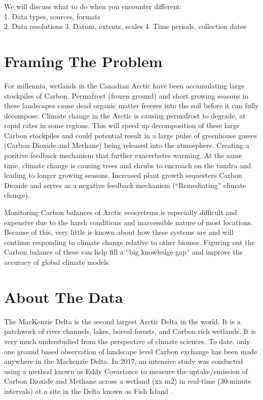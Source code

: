 \documentclass[
]{book}
\begin{document}
We will discuss what to do when you encounter different:\\
1. Data types, sources, formats\\
2. Data resolutions
3. Datum, extents, scales
4. Time periods, collection dates

\hypertarget{framing-the-problem}{%
\section{Framing The Problem}\label{framing-the-problem}}

For millennia, wetlands in the Canadian Arctic have been accumulating large stockpiles of Carbon. Permafrost (frozen ground) and short growing seasons in these landscapes cause dead organic matter freezes into the soil before it can fully decompose. Climate change in the Arctic is causing permafrost to degrade, at rapid rates in some regions. This will speed up decomposition of these large Carbon stockpiles and could potential result in a large pulse of greenhouse gasses (Carbon Dioxide and Methane) being released into the atmosphere. Creating a positive feedback mechanism that further exacerbates warming. At the same time, climate change is causing trees and shrubs to encroach on the tundra and leading to longer growing seasons. Increased plant growth sequesters Carbon Dioxide and serves as a negative feedback mechanism (``Remediating'' climate change).

Monitoring Carbon balances of Arctic ecosystems is especially difficult and expensive due to the harsh conditions and inaccessible nature of most locations. Because of this, very little is known about how these systems are and will continue responding to climate change relative to other biomes. Figuring out the Carbon balance of these can help fill a ``big knowledge gap'' and improve the accuracy of global climate models.

\hypertarget{about-the-data}{%
\section{About The Data}\label{about-the-data}}

The MacKenzie Delta is the second largest Arctic Delta in the world. It is a patchwork of river channels, lakes, boreal forests, and Carbon rich wetlands. It is very much understudied from the perspective of climate sciences. To date, only one ground based observation of landscape level Carbon exchange has been made anywhere in the Mackenzie Delta. In 2017, an intensive study was conducted using a method known as Eddy Covariance to measure the uptake/emission of Carbon Dioxide and Methane across a wetland (xx m2) in real-time (30-minute intervals) at a site in the Delta known as Fish Island \citep{skeeter_controls_2022}.
\end{document}

